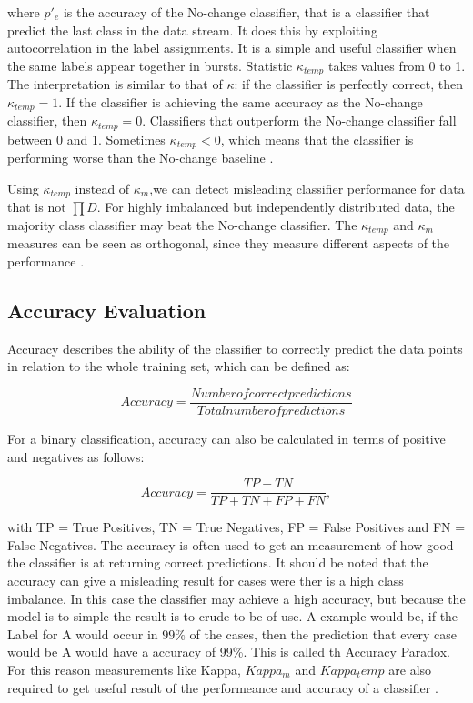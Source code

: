 \documentclass[12pt,oneside,a4paper,parskip]{scrbook}
\begin{document}
where $p'_e$ is the accuracy of the No-change classifier, that is a classifier that predict the last class in the data stream. 
It does this by exploiting autocorrelation in the label assignments. It is a simple and useful classifier when the same labels appear together in bursts.
Statistic $\kappa_\textit{temp}$ takes values from 0 to 1. The interpretation is similar to that of $\kappa$: if the
classifier is perfectly correct, then $\kappa_\textit{temp} = 1$. If the classifier is achieving the same accuracy as the No-change
classifier, then $\kappa_\textit{temp} = 0$. Classifiers that outperform the No-change classifier fall between 0 and 1. Sometimes
$\kappa_\textit{temp} < 0$, which means that the classifier is performing worse than the No-change baseline \cite{MLonDataStreams}.

Using $\kappa_\textit{temp}$ instead of $\kappa_m$,we can detect misleading classifier performance for data that is not $\prod D$. 
For highly imbalanced but independently distributed data, the majority class classifier may beat the No-change classifier.
The $\kappa_\textit{temp}$ and $\kappa_m$ measures can be seen as orthogonal, since they measure different aspects of the performance \cite{MLonDataStreams}.

\subsection{Accuracy Evaluation}
Accuracy describes the ability of the classifier to correctly predict the data points in relation to the whole training set,
which can be defined as:

\begin{equation}
  Accuracy = \frac{Number of correct predictions}{Total number of predictions}
\end{equation}

For a binary classification, accuracy can also be calculated in terms of positive and negatives as follows:

\begin{equation}
  Accuracy = \frac{TP+TN}{TP+TN+FP+FN},
\end{equation}

with TP = True Positives, TN = True Negatives, FP = False Positives and FN = False Negatives.
The accuracy is often used to get an measurement of how good the classifier is at returning correct predictions. 
It should be noted that the accuracy can give a misleading result for  cases were ther is a high class imbalance.
In this case the classifier may achieve a high accuracy, but because the model is to simple the result is to crude to be of use.
A example would be, if the Label for A would occur in $99\%$ of the cases, then the prediction that every case would be A 
would have a accuracy of 99\%. This is called th Accuracy Paradox.
For this reason measurements like Kappa, $Kappa_m$ and $Kappa_temp$ are also required to get useful result of the
performeance and accuracy of a classifier \cite{MLonDataStreams}.
\end{document}
